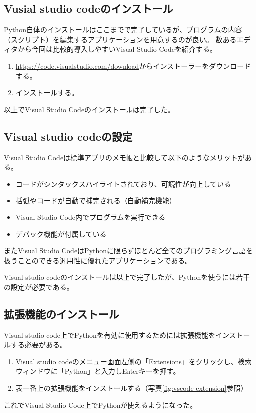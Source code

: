 \documentclass[]{article}
\begin{document}
	\subsection{Vusial studio codeのインストール}
	Python自体のインストールはここまでで完了しているが、プログラムの内容（スクリプト）を編集するアプリケーションを用意するのが良い。
	数あるエディタから今回は比較的導入しやすいVisual Studio Codeを紹介する。

	\begin{enumerate}
		\item \url{https://code.visualstudio.com/download}からインストーラーをダウンロードする。
		\item インストールする。
	\end{enumerate}
	以上でVisual Studio Codeのインストールは完了した。

	\subsection{Visual studio codeの設定}
	Visual Studio Codeは標準アプリのメモ帳と比較して以下のようなメリットがある。
	\begin{itemize}
		\item コードがシンタックスハイライトされており、可読性が向上している
		\item 括弧やコードが自動で補完される（自動補完機能）
		\item Visual Studio Code内でプログラムを実行できる
		\item デバック機能が付属している
	\end{itemize}
	またVisual Studio CodeはPythonに限らずほとんど全てのプログラミング言語を扱うことのできる汎用性に優れたアプリケーションである。

	Visual studio codeのインストールは以上で完了したが、Pythonを使うには若干の設定が必要である。

	\subsection{拡張機能のインストール}
	Visual studio code上でPythonを有効に使用するためには拡張機能をインストールする必要がある。
	\begin{enumerate}
		\item Visual studio codeのメニュー画面左側の「Extensions」をクリックし、検索ウィンドウに「Python」と入力しEnterキーを押す。
		\item 表一番上の拡張機能をインストールする（写真\ref{fig:vscode-extension}参照）
	\end{enumerate}
	これでVisual Studio Code上でPythonが使えるようになった。
\end{document}
